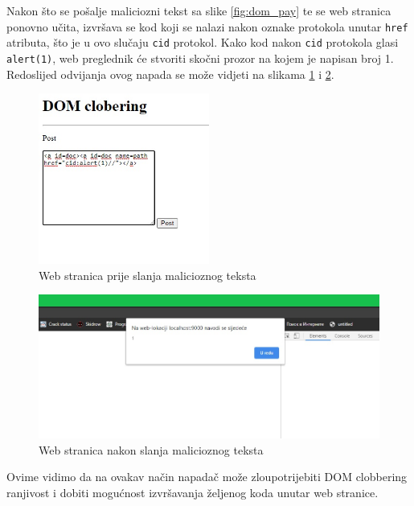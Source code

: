 \documentclass[12pt, oneside, onecolumn]{book}
\begin{document}
{Nakon što se pošalje maliciozni tekst sa slike \ref{fig:dom_pay} te se web stranica ponovno učita, izvršava se kod koji se nalazi nakon oznake protokola unutar \texttt{href} atributa, što je u ovo slučaju \texttt{cid} protokol. Kako kod nakon \texttt{cid} protokola glasi \texttt{alert(1)}, web preglednik će stvoriti skočni prozor na kojem je napisan broj 1. Redoslijed odvijanja ovog napada se može vidjeti na slikama \ref{fig:dom_ab} i \ref{fig:dom_eff}.

\begin{figure}[H]
	\begin{center}
		\includegraphics[width=0.5\textwidth]{dom_ab.jpg}
		\caption{Web stranica prije slanja malicioznog teksta} \label{fig:dom_ab}
	\end{center}
\end{figure}

\begin{figure}[H]
	\begin{center}
		\includegraphics[width=\textwidth]{dom_eff.jpg}
		\caption{Web stranica nakon slanja malicioznog teksta} \label{fig:dom_eff}
	\end{center}
\end{figure}

Ovime vidimo da na ovakav način napadač može zloupotrijebiti DOM clobbering ranjivost i dobiti mogućnost izvršavanja željenog koda unutar web stranice.

}
\end{document}
